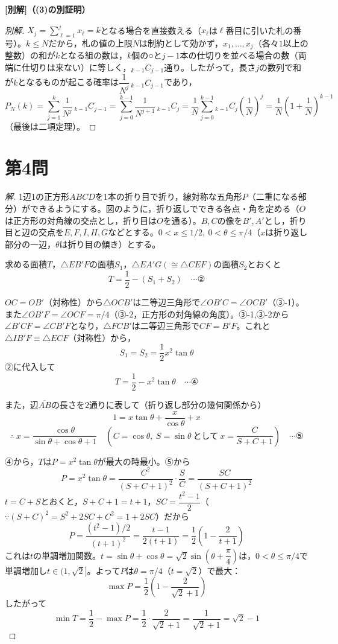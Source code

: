 \documentclass[../main.tex]{subfiles}
\begin{document}
\bigskip
\noindent\textbf{[別解]（(3)の別証明）}

\begin{proof}[別解]
  $X_j=\displaystyle\sum_{\ell=1}^jx_\ell=k$となる場合を直接数える（$x_\ell$は$\ell$番目に引いた札の番号）。$k\le N$だから，札の値の上限$N$は制約として効かず，$x_1,\dots,x_j$（各々$1$以上の整数）の和が$k$となる組の数は，$k$個の○と$j-1$本の仕切りを並べる場合の数（両端に仕切りは来ない）に等しく，${}_{k-1}C_{j-1}$通り。したがって，長さ$j$の数列で和が$k$となるものが起こる確率は$\dfrac1{N^j}\,{}_{k-1}C_{j-1}$であり，
  \[
    P_N(k)=\sum_{j=1}^k\frac1{N^j}\,{}_{k-1}C_{j-1}=\sum_{j=0}^{k-1}\frac1{N^{j+1}}\,{}_{k-1}C_j=\frac1N\sum_{j=0}^{k-1}{}_{k-1}C_j\left(\frac1N\right)^j=\frac1N\left(1+\frac1N\right)^{k-1}
  \]
  （最後は二項定理）。
\end{proof}

\newpage

\section*{第4問}

\begin{proof}[解]
  1辺1の正方形$ABCD$を1本の折り目で折り，線対称な五角形$P$（二重になる部分）ができるようにする。図のように，折り返しでできる各点・角を定める（$O$は正方形の対角線の交点とし，折り目は$O$を通る）。$B,C$の像を$B',A'$とし，折り目と辺の交点を$E,F,I,H,G$などとする。$0<x\le1/2,\ 0<\theta\le\pi/4$（$x$は折り返し部分の一辺，$\theta$は折り目の傾き）とする。

  求める面積$T$，$\triangle EB'F$の面積$S_1$，$\triangle EA'G(\cong\triangle CEF)$の面積$S_2$とおくと
  \[
    T=\frac12-(S_1+S_2) \quad\cdots\text{②}
  \]

  $OC=OB'$（対称性）から$\triangle OCB'$は二等辺三角形で$\angle OB'C=\angle OCB'$（③-1）。また$\angle OB'F=\angle OCF=\pi/4$（③-2，正方形の対角線の角度）。③-1,③-2から$\angle B'CF=\angle CB'F$となり，$\triangle FCB'$は二等辺三角形で$CF=B'F$。これと$\triangle IB'F\equiv\triangle ECF$（対称性）から，
  \[
    S_1=S_2=\frac12x^2\tan\theta
  \]
  ②に代入して
  \[
    T=\frac12-x^2\tan\theta \quad\cdots\text{④}
  \]

  また，辺$\overline{AB}$の長さを$2$通りに表して（折り返し部分の幾何関係から）
  \[
    1=x\tan\theta+\frac x{\cos\theta}+x
  \]
  \[
    \therefore\ x=\frac{\cos\theta}{\sin\theta+\cos\theta+1} \quad(C=\cos\theta,\ S=\sin\theta\ \text{として}\ x=\frac C{S+C+1}) \quad\cdots\text{⑤}
  \]

  ④から，$T$は$P=x^2\tan\theta$が最大の時最小。⑤から
  \[
    P=x^2\tan\theta=\frac{C^2}{(S+C+1)^2}\cdot\frac SC=\frac{SC}{(S+C+1)^2}
  \]
  $t=C+S$とおくと，$S+C+1=t+1$，$SC=\dfrac{t^2-1}2$（$\because(S+C)^2=S^2+2SC+C^2=1+2SC$）だから
  \[
    P=\frac{(t^2-1)/2}{(t+1)^2}=\frac{t-1}{2(t+1)}=\frac12\left(1-\frac2{t+1}\right)
  \]
  これは$t$の単調増加関数。$t=\sin\theta+\cos\theta=\sqrt2\sin\left(\theta+\dfrac\pi4\right)$は，$0<\theta\le\pi/4$で単調増加し$t\in(1,\sqrt2]$。よって$P$は$\theta=\pi/4$（$t=\sqrt2$）で最大：
  \[
    \max P=\frac12\left(1-\frac2{\sqrt2+1}\right)
  \]
  したがって
  \[
    \min T=\frac12-\max P=\frac12\cdot\frac2{\sqrt2+1}=\frac1{\sqrt2+1}=\sqrt2-1
  \]
\end{proof}
\end{document}

